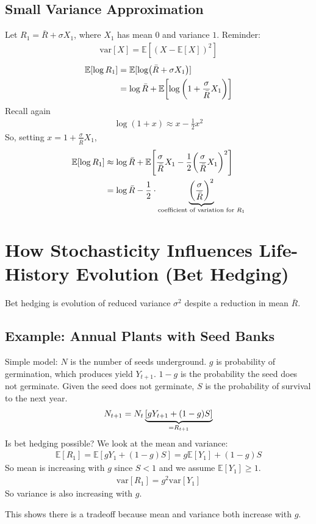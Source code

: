 \documentclass{article}
\newcommand{\expec}{\mathbb{E}}
\begin{document}
        \subsection{Small Variance Approximation}
            Let $R_1 = \bar{R} + \sigma X_1$, where $X_1$ has mean $0$ and variance $1$.  Reminder:
            \begin{align*}
                \text{var}[X] = \expec[(X - \expec[X])^2]
            \end{align*}
            \begin{align*}
                \expec[\log R_1] &= \expec[\log(\bar{R} + \sigma X_1)] \\
                &= \log \bar{R} + \expec\qty[\log\qty(1 + \frac{\sigma}{\bar{R}}X_1)]
            \end{align*}
            Recall again
            \begin{align*}
                \log(1 + x) \approx x - \frac{1}{2}x^2
            \end{align*}
            So, setting $x = 1 + \frac{\sigma}{\bar{R}}X_1$,
            \begin{align*}
                \expec[\log R_1] &\approx \log \bar{R} + \expec\qty[\frac{\sigma}{\bar{R}}X_1 - \frac{1}{2}\qty(\frac{\sigma}{\bar{R}}X_1)^2] \\
                &= \log \bar{R} - \frac{1}{2}\cdot\underbrace{\qty(\frac{\sigma}{\bar{R}})^2}_{\text{coefficient of variation for $R_1$}}
            \end{align*}

    \section{How Stochasticity Influences Life-History Evolution (Bet Hedging)}
        Bet hedging is evolution of reduced variance $\sigma^2$ despite a reduction in mean $\bar{R}$.
        \subsection{Example: Annual Plants with Seed Banks}
            Simple model: $N$ is the number of seeds underground.  $g$ is probability of germination, which produces yield $Y_{t+1}$.  $1 - g$ is the probability the seed does not germinate.  Given the seed does not germinate, $S$ is the probability of survival to the next year.
            \begin{align*}
                N_{t+1} = N_t\underbrace{\qty[g Y_{t+1} + (1 - g)S]}_{=R_{t+1}}
            \end{align*}
            Is bet hedging possible?  We look at the mean and variance:
            \begin{align}
                \expec[R_1] = \expec[gY_1 + (1 - g)S] = g\expec[Y_1] + (1 - g)S
            \end{align}
            So mean is increasing with $g$ since $S < 1$ and we assume $\expec[Y_1] \geq 1$.
            \begin{align}
                \text{var}[R_1] = g^2\text{var}[Y_1]
            \end{align}
            So variance is also increasing with $g$.

            This shows there is a tradeoff because mean and variance both increase with $g$.
\end{document}
